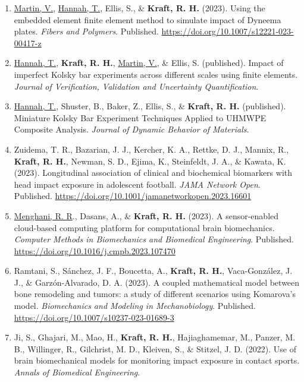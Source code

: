 \documentclass[11pt]{article}
\begin{document}
\begin{enumerate}
\def\labelenumi{\arabic{enumi}.}
\item
  \underline{Martin, V.}, \underline{Hannah, T.}, Ellis, S., \& \textbf{\textbf{Kraft,} R. 
H.} (2023). 
Using the
  embedded element finite element method to simulate impact of Dyneema
  plates. 
\emph{Fibers and Polymers}. 
Published.
  \url{https://doi.org/10.1007/s12221-023-00417-z}
\item
  \underline{Hannah, T.}, \textbf{\textbf{Kraft,} R. 
H.}, \underline{Martin, V.}, \& Ellis, S. 
(published). 
Impact
  of imperfect Kolsky bar experiments across different scales using
  finite elements. 
\emph{Journal of Verification, Validation and
  Uncertainty Quantification}.
\item
  \underline{Hannah, T.}, Shuster, B., Baker, Z., Ellis, S., \& \textbf{\textbf{Kraft,} R. 
H.}
  (published). 
Miniature Kolsky Bar Experiment Techniques Applied to
  UHMWPE Composite Analysis. 
\emph{Journal of Dynamic Behavior of
  Materials}.
\item
  Zuidema, T. 
R., Bazarian, J. 
J., Kercher, K. 
A., Rettke, D. 
J.,
  Mannix, R., \textbf{\textbf{Kraft,} R. 
H.}, Newman, S. 
D., Ejima, K., Steinfeldt, J. 
A.,
  \& Kawata, K. 
(2023). 
Longitudinal association of clinical and
  biochemical biomarkers with head impact exposure in adolescent
  football. 
\emph{JAMA Network Open}. 
Published.
  \url{https://doi.org/10.1001/jamanetworkopen.2023.16601}
\item
  \underline{Menghani, R. 
R}., Dasans, A., \& \textbf{\textbf{Kraft,} R. 
H.} (2023). 
A sensor-enabled
  cloud-based computing platform for computational brain biomechanics.
  \emph{Computer Methods in Biomechanics and Biomedical Engineering}.
  Published. 
\url{https://doi.org/10.1016/j.cmpb.2023.107470}
\item
  Ramtani, S., Sánchez, J. 
F., Boucetta, A., \textbf{\textbf{Kraft,} R. 
H.},
  Vaca-González, J. 
J., \& Garzón-Alvarado, D. 
A. 
(2023). 
A coupled
  mathematical model between bone remodeling and tumors: a study of
  different scenarios using Komarova's model. 
\emph{Biomechanics and
  Modeling in Mechanobiology}. 
Published.
  \url{https://doi.org/10.1007/s10237-023-01689-3}
\item
  Ji, S., Ghajari, M., Mao, H., \textbf{\textbf{Kraft,} R. 
H.}, Hajiaghamemar, M., Panzer,
  M. 
B., Willinger, R., Gilchrist, M. 
D., Kleiven, S., \& Stitzel, J. 
D.
  (2022). 
Use of brain biomechanical models for monitoring impact
  exposure in contact sports. 
\emph{Annals of Biomedical Engineering}.

\end{enumerate}
\end{document}
